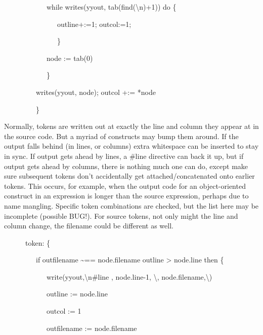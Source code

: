 {\ttfamily\mdseries
\ \ \ \ \ \ \ \ \ \ \ \ while writes(yyout, tab(find({\textquotedbl}{\textbackslash}n{\textquotedbl})+1)) do \{}

{\ttfamily\mdseries
\ \ \ \ \ \ \ \ \ \ \ \ \ \ \ outline+:=1; outcol:=1;}

{\ttfamily\mdseries
\ \ \ \ \ \ \ \ \ \ \ \ \ \ \ \}}

{\ttfamily\mdseries
\ \ \ \ \ \ \ \ \ \ \ \ node := tab(0)}

{\ttfamily\mdseries
\ \ \ \ \ \ \ \ \ \ \ \ \}}

{\ttfamily\mdseries
\ \ \ \ \ \ \ \ \ writes(yyout, node); outcol +:= *node}

{\ttfamily\mdseries
\ \ \ \ \ \ \ \ \ \}}


{\textquotedbl}Normally{\textquotedbl}, tokens are written out at
exactly the line and column they appear at in the source code. But a
myriad of constructs may bump them around. If the output falls behind
(in lines, or columns) extra whitespace can be inserted to stay in
sync. If output gets ahead by lines, a \#line directive can back it
up, but if output gets ahead by columns, there is nothing much one can
do, except make sure subsequent tokens don't accidentally get
attached/concatenated onto earlier tokens. This occurs, for example,
when the output code for an object-oriented construct in an expression
is longer than the source expression, perhaps due to name
mangling. Specific token combinations are checked, but the list here
may be incomplete (possible BUG!). For source tokens, not only might
the line and column change, the filename could be different as well.

{\ttfamily\mdseries
\ \ \ \ \ \ {\textquotedbl}token{\textquotedbl}: \{}

{\ttfamily\mdseries
\ \ \ \ \ \ \ \ \ if outfilename \~{}== node.filename {\textbar} outline {\textgreater} node.line then \{}

{\ttfamily\mdseries
\ \ \ \ \ \ \ \ \ \ \ \ write(yyout,{\textquotedbl}{\textbackslash}n\#line {\textquotedbl}, node.line-1,{\textquotedbl}
{\textbackslash}{\textquotedbl}{\textquotedbl},
node.filename,{\textquotedbl}{\textbackslash}{\textquotedbl}{\textquotedbl})}

{\ttfamily\mdseries
\ \ \ \ \ \ \ \ \ \ \ \ outline := node.line}

{\ttfamily\mdseries
\ \ \ \ \ \ \ \ \ \ \ \ outcol := 1}

{\ttfamily\mdseries
\ \ \ \ \ \ \ \ \ \ \ \ outfilename := node.filename}

